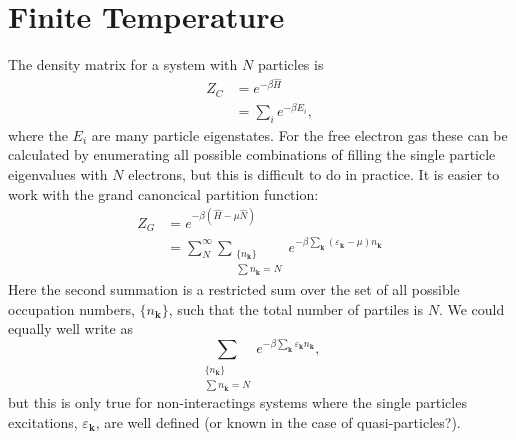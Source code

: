 \documentclass[11pt,twosided]{article}
\begin{document}
\section{Finite Temperature}
The density matrix for a system with $N$ particles is
\begin{align}\label{canonical}
    Z_C &= e^{-\beta\hat{H}}\\
        &= \sum_i e^{-\beta E_i},
\end{align}
where the $E_i$ are many particle eigenstates.
For the free electron gas these can be calculated by enumerating all possible combinations of filling the single particle eigenvalues with $N$ electrons, but this is difficult to do in practice.
It is easier to work with the grand canoncical partition function:
\begin{align}\label{grand_can}
    Z_G &= e^{-\beta(\hat{H}-\mu\hat{N})}\\
        &= \sum_N^\infty\sum_{\substack{\{n_\mathbf{k}\}\\ \sum n_{\mathbf{k}}=N}} e^{-\beta\sum_{\mathbf{k}}(\varepsilon_\mathbf{k}-\mu)n_{\mathbf{k}}}
\end{align}
Here the second summation is a restricted sum over the set of all possible occupation numbers, $\{n_{\mathbf{k}}\}$, such that the total number of partiles is $N$.
We could equally well write  as
\begin{equation}
    \sum_{\substack{\{n_\mathbf{k}\}\\ \sum n_{\mathbf{k}}=N}} e^{-\beta\sum_{\mathbf{k}}\varepsilon_\mathbf{k}n_{\mathbf{k}}},
\end{equation}
but this is only true for non-interactings systems where the single particles excitations, $\varepsilon_\mathbf{k}$, are well defined (or known in the case of quasi-particles?).
\end{document}
